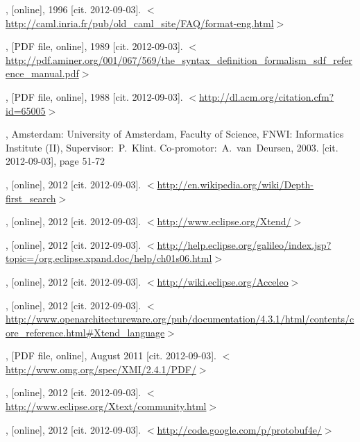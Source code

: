\documentclass[12pt,notitlepage,a4paper]{report}
\begin{document}
\begin{thebibliography}{99}
, [online], 1996 [cit. 2012-09-03]. $<$\url{http://caml.inria.fr/pub/old_caml_site/FAQ/format-eng.html}$>$

, [PDF file, online], 1989 [cit. 2012-09-03]. $<$\url{http://pdf.aminer.org/001/067/569/the_syntax_definition_formalism_sdf_reference_manual.pdf}$>$

, [PDF file, online], 1988 [cit. 2012-09-03]. $<$\url{http://dl.acm.org/citation.cfm?id=65005}$>$

, Amsterdam: University of Amsterdam, Faculty of Science, FNWI: Informatics Institute (II),  Supervisor:~P.~Klint. Co-promotor:~A.~van~Deursen, 2003.  [cit. 2012-09-03], page 51-72

, [online], 2012 [cit. 2012-09-03]. $<$\url{http://en.wikipedia.org/wiki/Depth-first_search}$>$

, [online], 2012 [cit. 2012-09-03]. $<$\url{http://www.eclipse.org/Xtend/}$>$

, [online], 2012 [cit. 2012-09-03]. $<$\url{http://help.eclipse.org/galileo/index.jsp?topic=/org.eclipse.xpand.doc/help/ch01s06.html}$>$

, [online], 2012 [cit. 2012-09-03]. $<$\url{http://wiki.eclipse.org/Acceleo}$>$

, [online], 2012 [cit. 2012-09-03]. $<$\url{http://www.openarchitectureware.org/pub/documentation/4.3.1/html/contents/core_reference.html#Xtend_language}$>$

, [PDF file, online], August  2011 [cit. 2012-09-03]. $<$\url{http://www.omg.org/spec/XMI/2.4.1/PDF/}$>$

, [online], 2012 [cit. 2012-09-03]. $<$\url{http://www.eclipse.org/Xtext/community.html}$>$

, [online], 2012 [cit. 2012-09-03]. $<$\url{http://code.google.com/p/protobuf4e/}$>$


\end{thebibliography}
\end{document}
